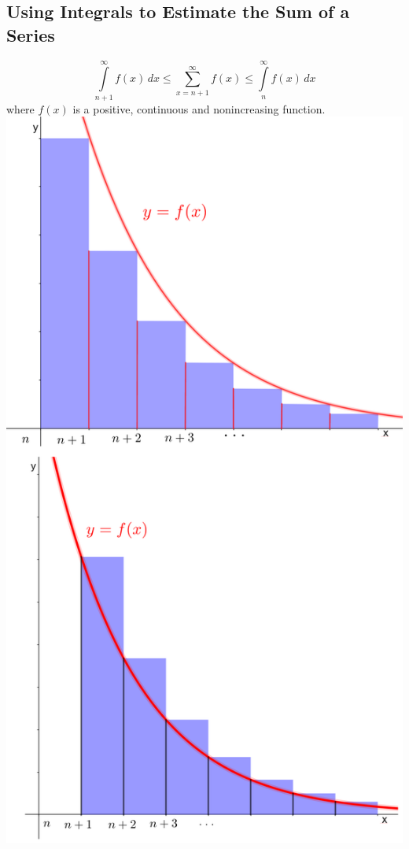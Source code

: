 \documentclass[12pt]{article}
\begin{document}
\subsection{Using Integrals to Estimate the Sum of a Series}
$$\int \limits_{n+1}^\infty f(x)\,dx\leq \sum \limits_{x = n+1}^\infty f(x)\leq \int \limits_{n}^\infty f(x)\,dx$$ where $f(x)$ is a positive, continuous and nonincreasing function.\\
\includegraphics[scale=0.23]{seriesintegral.png}
\newpage
\end{document}
